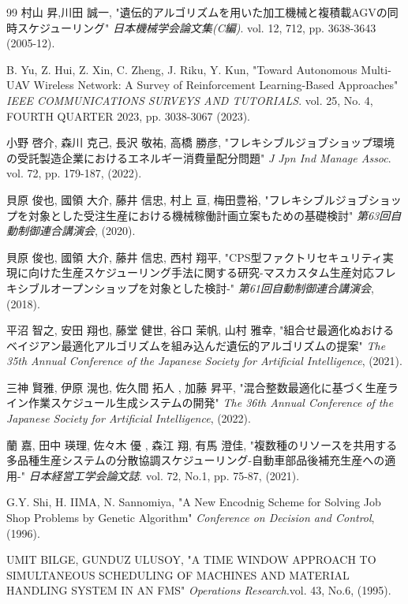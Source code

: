 \documentclass{jarticle}
\begin{document}
\begin{thebibliography}{99}
 村山 昇,川田 誠一, "遺伝的アルゴリズムを用いた加工機械と複積載AGVの同時スケジューリング"
\textit{日本機械学会論文集(C編)}. vol. 12, 712, pp. 3638-3643 (2005-12).

 B. Yu, Z. Hui, Z. Xin, C. Zheng, J. Riku, Y. Kun, "Toward Autonomous Multi-UAV Wireless Network: A Survey of Reinforcement Learning-Based Approaches"
\textit{IEEE COMMUNICATIONS SURVEYS AND TUTORIALS}. vol. 25, No. 4, FOURTH QUARTER 2023, pp. 3038-3067 (2023).

 小野 啓介, 森川 克己, 長沢 敬祐, 高橋 勝彦, "フレキシブルジョブショップ環境の受託製造企業におけるエネルギー消費量配分問題"
\textit{J Jpn Ind Manage Assoc}. vol. 72, pp. 179-187, (2022).

 貝原 俊也, 國領 大介, 藤井 信忠, 村上 亘, 梅田豊裕, "フレキシブルジョブショップを対象とした受注生産における機械稼働計画立案もための基礎検討"
\textit{第63回自動制御連合講演会}, (2020).

 貝原 俊也, 國領 大介, 藤井 信忠, 西村 翔平, "CPS型ファクトリセキュリティ実現に向けた生産スケジューリング手法に関する研究-マスカスタム生産対応フレキシブルオープンショップを対象とした検討-"
\textit{第61回自動制御連合講演会}, (2018).

 平沼 智之, 安田 翔也, 藤堂 健世, 谷口 茉帆, 山村 雅幸, "組合せ最適化ぬおけるベイジアン最適化アルゴリズムを組み込んだ遺伝的アルゴリズムの提案"
\textit{The 35th Annual Conference of the Japanese Society for Artificial Intelligence}, (2021).

 三神 賢雅, 伊原 滉也, 佐久間 拓人 , 加藤 昇平, "混合整数最適化に基づく生産ライン作業スケジュール生成システムの開発"
\textit{The 36th Annual Conference of the Japanese Society for Artificial Intelligence}, (2022).

 蘭 嘉, 田中 瑛理, 佐々木 優 , 森江 翔, 有馬 澄佳, "複数種のリソースを共用する多品種生産システムの分散協調スケジューリング-自動車部品後補充生産への適用-"
\textit{日本経営工学会論文誌}. vol. 72, No.1, pp. 75-87, (2021).

 G.Y. Shi, H. IIMA, N. Sannomiya, "A New Encodnig Scheme for Solving Job Shop Problems by Genetic Algorithm"
\textit{Conference on Decision and Control}, (1996).

 UMIT BILGE, GUNDUZ ULUSOY, "A TIME WINDOW APPROACH TO SIMULTANEOUS SCHEDULING OF MACHINES AND MATERIAL HANDLING SYSTEM IN AN FMS"
\textit{Operations Research}.vol. 43, No.6, (1995).


\end{thebibliography}
\end{document}
